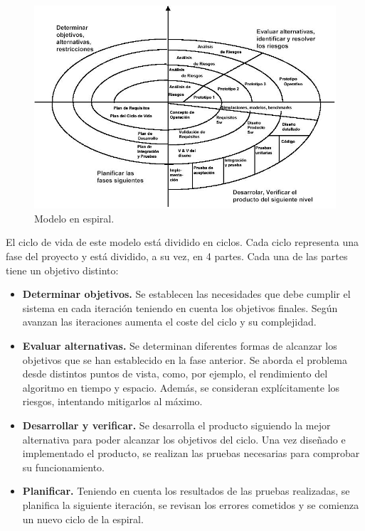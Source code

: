 \begin{figure} [hbtp]
  \begin{center}
    \includegraphics[width=16cm]{img/cap2/modelo_espiral}
  \end{center}
  \caption{Modelo en espiral.}
  \label{fig:modelo_espiral}
\end{figure}

El ciclo de vida de este modelo está dividido en ciclos. Cada ciclo representa una fase del proyecto y está dividido, a su vez, en 4 partes. Cada una de las partes tiene un objetivo distinto:

\begin{itemize}
\item \textbf{Determinar objetivos.} Se establecen las necesidades que debe cumplir el sistema en cada iteración teniendo en cuenta los objetivos finales. Según avanzan las iteraciones aumenta el coste del ciclo y su complejidad.
\item \textbf{Evaluar alternativas.} Se determinan diferentes formas de alcanzar los objetivos que se han establecido en la fase anterior. Se aborda el problema desde distintos puntos de vista, como, por ejemplo, el rendimiento del algoritmo en tiempo y espacio. Además, se consideran explícitamente los riesgos, intentando mitigarlos al máximo.
\item \textbf{Desarrollar y verificar.} Se desarrolla el producto siguiendo la mejor alternativa para poder alcanzar los objetivos del ciclo. Una vez diseñado e implementado el producto, se realizan las pruebas necesarias para comprobar su funcionamiento.
\item \textbf{Planificar.} Teniendo en cuenta los resultados de las pruebas realizadas, se planifica la siguiente iteración, se revisan los errores cometidos y se comienza un nuevo ciclo de la espiral.
\end{itemize}

